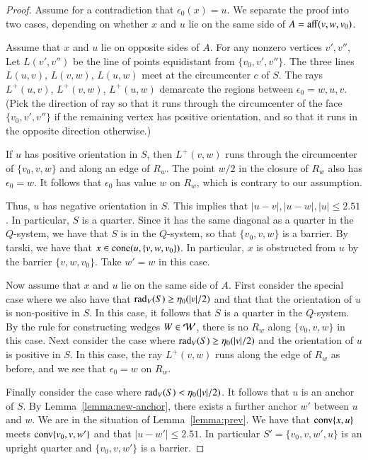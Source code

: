 \begin{proof} Assume for a contradiction that $\epsilon_0(x)=u$.
We separate the proof into two cases, depending on whether
$x$ and $u$ lie on the same side of $A={\operatorname{aff}}(v,w,v_0)$.

Assume that $x$ and $u$ lie on opposite sides of $A$.
For any nonzero vertices $v',v''$,
Let $L(v',v'')$ be the line of points equidistant from $\{v_0,v',v''\}$.
The three lines $L(u,v)$, $L(v,w)$, $L(u,w)$ meet at the circumcenter
$c$ of $S$.  The rays $L^+(u,v)$, $L^+(v,w)$, $L^+(u,w)$ demarcate
the regions between $\epsilon_0=w,u,v$.  (Pick the direction
of ray so that it runs through the circumcenter of the face $\{v_0,v',v''\}$
if the remaining vertex has positive orientation, and so that it
runs in the opposite direction otherwise.)

If $u$ has positive orientation in $S$, then $L^+(v,w)$ runs through
the circumcenter of $\{v_0,v,w\}$ and along an edge of $R_w$.
The point $w/2$ in the closure of  $R_w$ also has $\epsilon_0=w$.
It follows that $\epsilon_0$ has value $w$ on $R_w$, which is contrary
to our assumption.

Thus, $u$ has negative orientation in $S$.  
This implies that $|u-v|,|u-w|,|u|\le 2.51$.  In particular,
$S$ is a quarter.  Since it has the same diagonal as a quarter in
the $Q$-system, we have that $S$ is in the $Q$-system, so that
$\{v_0,v,w\}$ is a barrier.  By tarski, we have
that $x\in {\operatorname{cone}}(u,\{v,w,v_0\})$.  In particular, $x$ is obstructed
from $u$ by the barrier $\{v,w,v_0\}$.  Take $w'=w$ in this case.

Now assume that $x$ and $u$ lie on the same side of $A$.
First consider the special case where
we also have that $\operatorname{rad}_V(S)\ge \eta_0(|v|/2)$ and that that
the orientation of $u$ is non-positive in $S$.  In this case, it
follows that $S$ is a quarter in the $Q$-system.  By the rule
for constructing wedges $W\in{\mathcal W}$, there is no $R_w$ along $\{v_0,v,w\}$
in this case.  Next consider the case where
$\operatorname{rad}_V(S)\ge \eta_0(|v|/2)$ and the orientation of $u$ is positive
in $S$.  In this case, the ray $L^+(v,w)$ runs along the edge of 
$R_w$ as before, and we see that $\epsilon_0=w$ on $R_w$.

Finally consider the case where $\operatorname{rad}_V(S)<\eta_0(|v|/2)$.
It follows that $u$ is an anchor of $S$.
By Lemma~\ref{lemma:new-anchor}, there exists a further anchor
$w'$ between $u$ and $w$.  We are in the situation of Lemma~\ref{lemma:prev}.
We have that ${\operatorname{conv}}\{x,u\}$ meets ${\operatorname{conv}}\{v_0,v,w'\}$ and
that $|u-w'|\le 2.51$.  In particular $S'=\{v_0,v,w',u\}$ is
an upright quarter and $\{v_0,v,w'\}$ is a barrier.
\end{proof}



